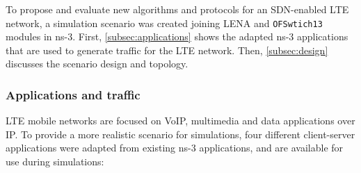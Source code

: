 To propose and evaluate new algorithms and protocols for an \ac{SDN}-enabled
\ac{LTE} network, a simulation scenario was created joining \ac{LENA} and
\texttt{OFSwtich13} modules in \ac{ns-3}. First, \autoref{subsec:applications}
shows the adapted \ac{ns-3} applications that are used to generate traffic for
the \ac{LTE} network. Then, \autoref{subsec:design} discusses the scenario
design and topology.

\subsubsection{Applications and traffic}
\label{subsec:applications}

\ac{LTE} mobile networks are focused on \ac{VoIP}, multimedia and data
applications over \ac{IP}. To provide a more realistic scenario for
simulations, four different client-server applications were adapted from
existing \ac{ns-3} applications, and are available for use during simulations:
